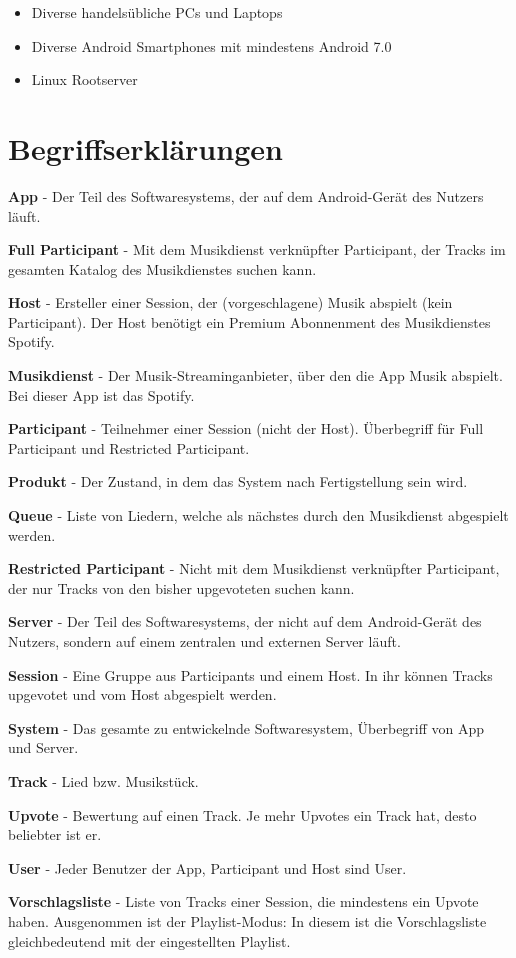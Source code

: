\documentclass[oneside, ngerman]{sdqtechreport}
\begin{document}
\begin{itemize}
    \item Diverse handelsübliche PCs und Laptops
    \item Diverse Android Smartphones mit mindestens Android 7.0
    \item Linux Rootserver
\end{itemize}



\chapter{Begriffserklärungen}
\label{chap:Begriffserklärungen}

\textbf{App}
 - Der Teil des Softwaresystems, der auf dem Android-Gerät des Nutzers läuft.

 \textbf{Full Participant}
 - Mit dem Musikdienst verknüpfter Participant, der Tracks im gesamten Katalog des Musikdienstes suchen kann.

\textbf{Host}
 - Ersteller einer Session, der (vorgeschlagene) Musik abspielt (kein Participant). Der Host benötigt ein Premium Abonnenment des Musikdienstes Spotify.

 \textbf{Musikdienst}
 - Der Musik-Streaminganbieter, über den die App Musik abspielt. Bei dieser App ist das Spotify.

 \textbf{Participant}
 - Teilnehmer einer Session (nicht der Host). Überbegriff für Full Participant und Restricted Participant.

 \textbf{Produkt}
 - Der Zustand, in dem das System nach Fertigstellung sein wird.

 \textbf{Queue}
 - Liste von Liedern, welche als nächstes durch den Musikdienst abgespielt werden.

 \textbf{Restricted Participant}
 - Nicht mit dem Musikdienst verknüpfter Participant, der nur Tracks von den bisher upgevoteten suchen kann.

 \textbf{Server}
 - Der Teil des Softwaresystems, der nicht auf dem Android-Gerät des Nutzers, sondern auf einem zentralen und externen Server läuft.

 \textbf{Session}
 - Eine Gruppe aus Participants und einem Host. In ihr können Tracks upgevotet und vom Host abgespielt werden.

\textbf{System}
 - Das gesamte zu entwickelnde Softwaresystem, Überbegriff von App und Server.

 \textbf{Track}
 - Lied bzw. Musikstück.

 \textbf{Upvote}
 - Bewertung auf einen Track. Je mehr Upvotes ein Track hat, desto beliebter ist er.

 \textbf{User}
 - Jeder Benutzer der App, Participant und Host sind User.

 \textbf{Vorschlagsliste}
 - Liste von Tracks einer Session, die mindestens ein Upvote haben. Ausgenommen ist der Playlist-Modus: In diesem ist die Vorschlagsliste gleichbedeutend mit der eingestellten Playlist.
 
\end{document}
